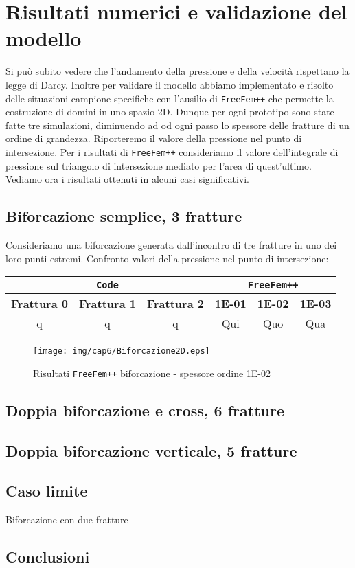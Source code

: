 \chapter{Risultati numerici e validazione del modello} 
Si pu\`{o} subito vedere che l'andamento della pressione e della velocit\`{a} rispettano la legge di Darcy.
Inoltre per validare il modello abbiamo implementato e risolto delle situazioni campione specifiche con l'ausilio di \texttt{FreeFem++} che permette la costruzione di domini in uno spazio 2D. Dunque per ogni prototipo sono state fatte tre simulazioni, diminuendo ad od ogni passo lo spessore delle fratture di un ordine di grandezza. 
Riporteremo il valore della pressione nel punto di intersezione. Per i risultati di \texttt{FreeFem++} consideriamo il valore dell'integrale di pressione sul triangolo di intersezione mediato per l'area di quest'ultimo.\\
Vediamo ora i risultati ottenuti in alcuni casi significativi.
\section{Biforcazione semplice, 3 fratture}
Consideriamo una biforcazione generata dall'incontro di tre fratture in uno dei loro punti estremi.
Confronto valori della pressione nel punto di intersezione:\\
\begin{tabular}{|c|c|c|c|c|c|}
\hline
\multicolumn{3}{|c|}{\textbf{\texttt{Code}}} & \multicolumn{3}{|c|}{\textbf{\texttt{FreeFem++}}} \\
\hline
\multicolumn{1}{|c|}{\textbf{Frattura 0}} & \textbf{Frattura 1} & \textbf{Frattura 2} &
\multicolumn{1}{|c|}{\textbf{1E-01}} & \textbf{1E-02} & \textbf{1E-03} \\
\hline
 q & q & q & Qui & Quo & Qua\\
\hline
\end{tabular}

\begin{figure}[h!]
\centering
\texttt{[image: img/cap6/Biforcazione2D.eps]}
\caption{Risultati \texttt{FreeFem++} biforcazione - spessore ordine 1E-02 }\label{Biforcazione1E-02}
\end{figure}


\section{Doppia biforcazione e cross, 6 fratture}
\section{Doppia biforcazione verticale, 5 fratture}

\section{Caso limite}
Biforcazione con due fratture

\section{Conclusioni}
